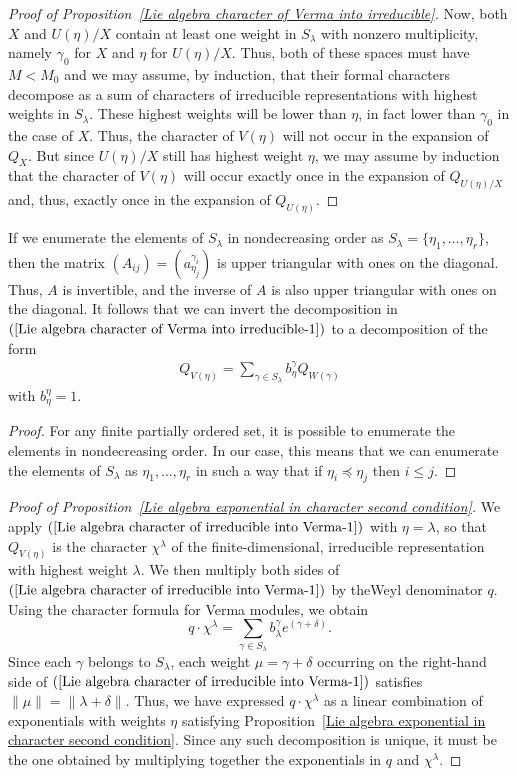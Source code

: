 \begin{proof}[Proof of Proposition~\ref{Lie algebra character of Verma into irreducible}]
Now, both $X$ and $U(\eta)/X$ contain at least one weight in $S_\lambda$ with nonzero multiplicity, namely $\gamma_0$ for $X$ and $\eta$ for $U(\eta)/X$. Thus, both of these spaces must have $M<M_0$ and we may assume, by induction, that their formal characters decompose as a sum of characters of irreducible representations with highest weights in $S_\lambda$. These highest weights will be lower than $\eta$, in fact lower than $\gamma_0$ in the case of $X$. Thus, the character of $V(\eta)$ will not occur in the expansion of $Q_X$. But since $U(\eta)/X$ still has highest weight $\eta$, we may assume by induction that the character of $V(\eta)$ will occur exactly once in the expansion of $Q_{U(\eta)/X}$ and, thus, exactly once in the expansion of $Q_{U(\eta)}$.
\end{proof}
\begin{corollary}\label{Lie algebra character of irreducible into Verma}
If we enumerate the elements of $S_\lambda$ in nondecreasing order as $S_\lambda=\{\eta_1,\dots,\eta_r\}$, then the matrix $(A_{ij})=(a_{\eta_j}^{\gamma_i})$ is upper triangular with ones on the diagonal. Thus, $A$ is invertible, and the inverse of $A$ is also upper triangular with ones on the diagonal. It follows that we can invert the decomposition in $(\ref{Lie algebra character of Verma into irreducible-1})$ to a decomposition of the form
\begin{align}\label{Lie algebra character of irreducible into Verma-1}
Q_{V(\eta)}=\sum_{\gamma\in S_\lambda}b_{\eta}^{\gamma}Q_{W(\gamma)}
\end{align}
with $b^\eta_\eta=1$.
\end{corollary}
\begin{proof}
For any finite partially ordered set, it is possible to enumerate the elements in nondecreasing order. In our case, this means that we can enumerate the elements of $S_\lambda$ as $\eta_1,\dots,\eta_r$ in such a way that if $\eta_i\preceq\eta_j$ then $i\leq j$.
\end{proof}
\begin{proof}[Proof of Proposition~\ref{Lie algebra exponential in character second condition}]
We apply $(\ref{Lie algebra character of irreducible into Verma-1})$ with $\eta=\lambda$, so that $Q_{V(\eta)}$ is the character $\chi^\lambda$ of the finite-dimensional, irreducible representation with highest weight $\lambda$. We then multiply both sides of $(\ref{Lie algebra character of irreducible into Verma-1})$ by theWeyl denominator $q$. Using the character formula for Verma modules, we obtain
\[q\cdot\chi^\lambda=\sum_{\gamma\in S_\lambda}b^\gamma_\lambda e^{(\gamma+\delta)}.\]
Since each $\gamma$ belongs to $S_\lambda$, each weight $\mu=\gamma+\delta$ occurring on the right-hand side of $(\ref{Lie algebra character of irreducible into Verma-1})$ satisfies $\|\mu\|=\|\lambda+\delta\|$. Thus, we have expressed $q\cdot\chi^\lambda$ as a linear combination of exponentials with weights $\eta$ satisfying Proposition~\ref{Lie algebra exponential in character second condition}. Since any such decomposition is unique, it must be the one obtained by multiplying together the exponentials in $q$ and $\chi^\lambda$.
\end{proof}
